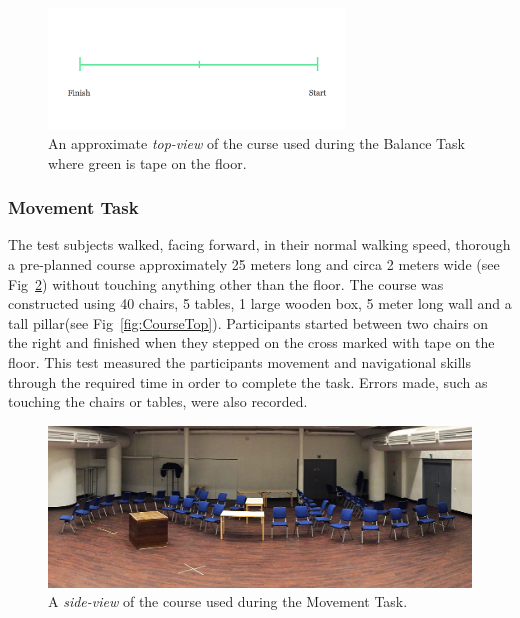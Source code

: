 \documentclass[runningheads,a4paper,oribibl]{llncs}
\begin{document}
\begin{figure}
   \centering
   \includegraphics[width=0.7\textwidth]{ExternalMaterial/BalanceTask}
   \caption{An approximate \emph{top-view} of the curse used during the Balance Task where green is tape on the floor.} \label{fig:BalanceTask}
\end{figure}

\subsubsection{Movement Task}

The test subjects walked, facing forward, in their normal walking speed, thorough a pre-planned course approximately 25 meters long and circa 2 meters wide (see Fig~\ref{fig:Course}) without touching anything other than the floor. The course was constructed using 40 chairs, 5 tables, 1 large wooden box, 5 meter long wall and a tall pillar(see Fig~\ref{fig:CourseTop}). Participants started between two chairs on the right and finished when they stepped on the cross marked with tape on the floor. This test measured the participants movement and navigational skills through the required time in order to complete the task. Errors made, such as touching the chairs or tables, were also recorded.

\begin{figure}
   \centering
   \includegraphics[width=\textwidth]{ExternalMaterial/Course2}
   \caption{A \emph{side-view} of the course used during the Movement Task.} \label{fig:Course}
\end{figure}
\end{document}
